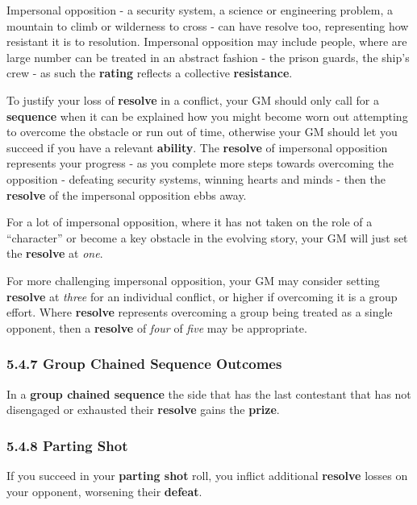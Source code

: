 \documentclass[
  11pt,
]{article}
\begin{document}
Impersonal opposition - a security system, a science or engineering
problem, a mountain to climb or wilderness to cross - can have resolve
too, representing how resistant it is to resolution. Impersonal
opposition may include people, where are large number can be treated in
an abstract fashion - the prison guards, the ship's crew - as such the
\textbf{rating} reflects a collective \textbf{resistance}.

To justify your loss of \textbf{resolve} in a conflict, your GM should
only call for a \textbf{sequence} when it can be explained how you might
become worn out attempting to overcome the obstacle or run out of time,
otherwise your GM should let you succeed if you have a relevant
\textbf{ability}. The \textbf{resolve} of impersonal opposition
represents your progress - as you complete more steps towards overcoming
the opposition - defeating security systems, winning hearts and minds -
then the \textbf{resolve} of the impersonal opposition ebbs away.

For a lot of impersonal opposition, where it has not taken on the role
of a ``character'' or become a key obstacle in the evolving story, your
GM will just set the \textbf{resolve} at \emph{one}.

For more challenging impersonal opposition, your GM may consider setting
\textbf{resolve} at \emph{three} for an individual conflict, or higher
if overcoming it is a group effort. Where \textbf{resolve} represents
overcoming a group being treated as a single opponent, then a
\textbf{resolve} of \emph{four} of \emph{five} may be appropriate.

\hypertarget{group-chained-sequence-outcomes}{%
\subsubsection{5.4.7 Group Chained Sequence
Outcomes}\label{group-chained-sequence-outcomes}}

In a \textbf{group chained sequence} the side that has the last
contestant that has not disengaged or exhausted their \textbf{resolve}
gains the \textbf{prize}.

\hypertarget{parting-shot-3}{%
\subsubsection{5.4.8 Parting Shot}\label{parting-shot-3}}

If you succeed in your \textbf{parting shot} roll, you inflict
additional \textbf{resolve} losses on your opponent, worsening their
\textbf{defeat}.
\end{document}

